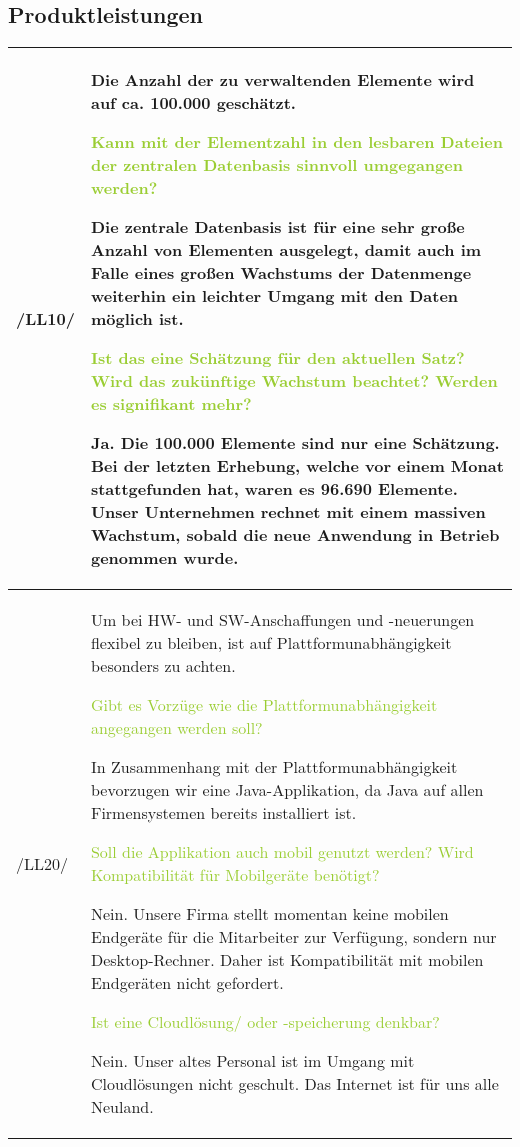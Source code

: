 \subsection{Produktleistungen}

\begin{center}
    \begin{tabular}[ht] {l | p{13cm}}
        \hline
        /LL10/ & Die Anzahl der zu verwaltenden Elemente wird auf ca. 100.000 geschätzt. 
        
        \textcolor{YellowGreen}{Kann mit der Elementzahl in den lesbaren Dateien der zentralen Datenbasis sinnvoll umgegangen werden?}

        \textcolor{NavyBlue}{Die zentrale Datenbasis ist für eine sehr große Anzahl von Elementen ausgelegt, damit auch im Falle eines großen Wachstums der Datenmenge weiterhin ein leichter Umgang mit den Daten möglich ist.}

        \textcolor{YellowGreen}{Ist das eine Schätzung für den \grqq{}aktuellen\grqq{} Satz? Wird das zukünftige Wachstum beachtet? Werden es signifikant mehr?}
        
        \textcolor{NavyBlue}{Ja. Die 100.000 Elemente sind nur eine Schätzung. Bei der letzten Erhebung, welche vor einem Monat stattgefunden hat, waren es 96.690 Elemente. Unser Unternehmen rechnet mit einem massiven Wachstum, sobald die neue Anwendung in Betrieb genommen wurde.}

        \\
        \hline
        /LL20/ & Um bei HW- und SW-Anschaffungen und -neuerungen flexibel zu bleiben, ist auf Plattformunabhängigkeit besonders zu achten. 
        
        \textcolor{YellowGreen}{Gibt es Vorzüge wie die Plattformunabhängigkeit angegangen werden soll?}

        \textcolor{NavyBlue}{In Zusammenhang mit der Plattformunabhängigkeit bevorzugen wir eine Java-Applikation, da Java auf allen Firmensystemen bereits installiert ist.}

        \textcolor{YellowGreen}{Soll die Applikation auch mobil genutzt werden? Wird Kompatibilität für Mobilgeräte benötigt?}

        \textcolor{NavyBlue}{Nein. Unsere Firma stellt momentan keine mobilen Endgeräte für die Mitarbeiter zur Verfügung, sondern nur Desktop-Rechner. Daher ist Kompatibilität mit mobilen Endgeräten nicht gefordert.}

        \textcolor{YellowGreen}{Ist eine Cloudlösung/ oder -speicherung denkbar?}

        \textcolor{NavyBlue}{Nein. Unser altes Personal ist im Umgang mit Cloudlösungen nicht geschult. Das Internet ist für uns alle Neuland.}

        \\
        \hline
    \end{tabular}
\end{center}

